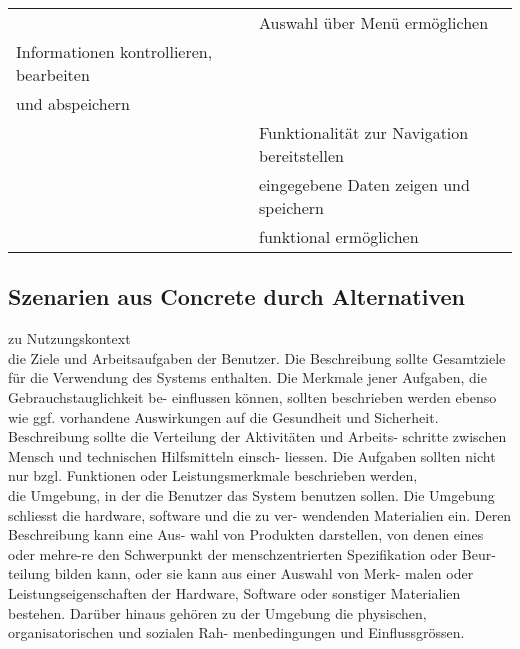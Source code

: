 \begin{table}[H]
\begin{tabular}{l l}
                                 & Auswahl über Menü ermöglichen           \\[1ex]
Informationen kontrollieren, bearbeiten   &                                   \\[1ex]
und abspeichern                     &                                   \\[1ex]
                                 & Funktionalität zur Navigation bereitstellen   \\[1ex]
                                 & eingegebene Daten zeigen und speichern     \\[1ex]
                                 & funktional ermöglichen                  \\[1ex]



\hline
\end{tabular}
\label{tab:mietobjektAUC}
\end{table}


\subsection{Szenarien aus Concrete durch Alternativen}

zu Nutzungskontext\\
die Ziele und Arbeitsaufgaben der Benutzer. Die Beschreibung sollte Gesamtziele für die Verwendung des Systems enthalten. Die Merkmale jener Aufgaben, die Gebrauchstauglichkeit be- einflussen können, sollten beschrieben werden ebenso wie ggf. vorhandene Auswirkungen auf die Gesundheit und Sicherheit. Beschreibung sollte die Verteilung der Aktivitäten und Arbeits- schritte zwischen Mensch und technischen Hilfsmitteln einsch- liessen. Die Aufgaben sollten nicht nur bzgl. Funktionen oder Leistungsmerkmale beschrieben werden,\\

die Umgebung, in der die Benutzer das System benutzen sollen. Die Umgebung schliesst die hardware, software und die zu ver- wendenden Materialien ein. Deren Beschreibung kann eine Aus- wahl von Produkten darstellen, von denen eines oder mehre-re den Schwerpunkt der menschzentrierten Spezifikation oder Beur- teilung bilden kann, oder sie kann aus einer Auswahl von Merk- malen oder Leistungseigenschaften der Hardware, Software oder sonstiger Materialien bestehen. Darüber hinaus gehören zu der Umgebung die physischen, organisatorischen und sozialen Rah- menbedingungen und Einflussgrössen.\\


